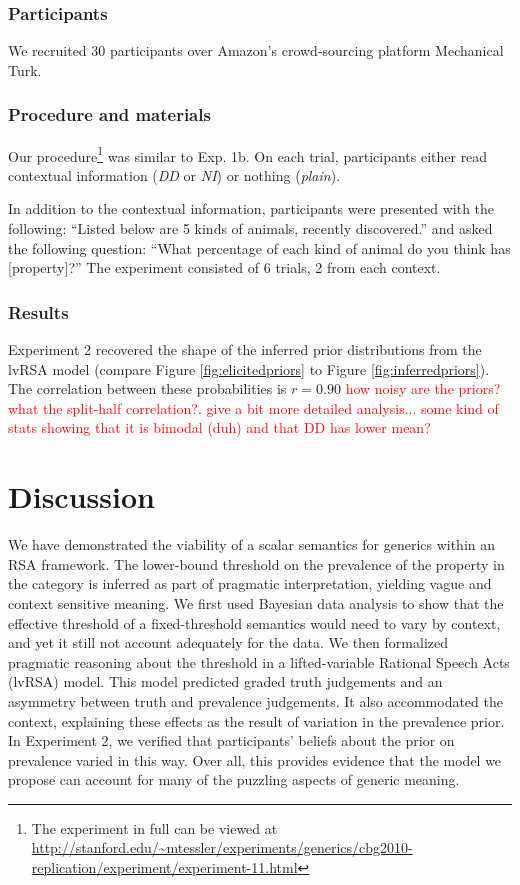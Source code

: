 \documentclass[10pt,letterpaper]{article}
\newcommand{\red}[1]{\textcolor{Red}{#1}}
\begin{document}
\subsubsection{Participants}

We recruited 30 participants over Amazon's crowd-sourcing platform Mechanical Turk. 

\subsubsection{Procedure and materials}

Our procedure\footnote{The experiment in full can be viewed at \url{http://stanford.edu/~mtessler/experiments/generics/cbg2010-replication/experiment/experiment-11.html}} was similar to Exp. 1b. On each trial, participants either read contextual information (\emph{DD} or \emph{NI}) or nothing (\emph{plain}). 

In addition to the contextual information, participants were presented with the following: ``Listed below are 5 kinds of animals, recently discovered.'' and asked the following question: ``What percentage of each kind of animal do you think has [property]?'' The experiment consisted of 6 trials, 2 from each context. 

\subsubsection{Results}

Experiment 2 recovered the shape of the inferred prior distributions from the lvRSA model (compare Figure \ref{fig:elicitedpriors} to Figure \ref{fig:inferredpriors}). The correlation between these probabilities is $r = 0.90$ \red{how noisy are the priors? what the split-half correlation?}.
\red{give a bit more detailed analysis... some kind of stats showing that it is bimodal (duh) and that DD has lower mean?}

\section{Discussion}

We have demonstrated the viability of a scalar semantics for generics within an RSA framework. The lower-bound threshold on the prevalence of the property in the category is inferred as part of pragmatic interpretation, yielding vague and context sensitive meaning. We first used Bayesian data analysis to show that the effective threshold of a fixed-threshold semantics would need to vary by context, and yet it still not account adequately for the data. We then formalized pragmatic reasoning about the threshold in a lifted-variable Rational Speech Acts (lvRSA) model. This model predicted graded truth judgements and an asymmetry between truth and prevalence judgements. It also accommodated the context, explaining these effects as the result of variation in the prevalence prior. In Experiment 2, we verified that participants' beliefs about the prior on prevalence varied in this way. Over all, this provides evidence that the model we propose can account for many of the puzzling aspects of generic meaning.
\end{document}

